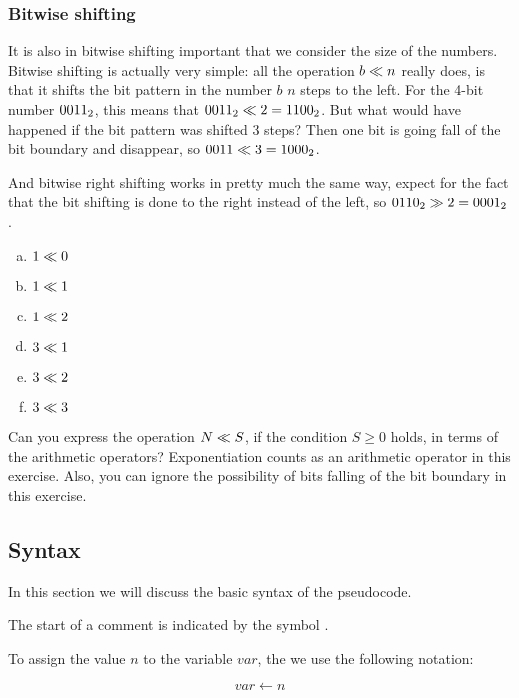 \subsubsection{Bitwise shifting}

It is also in bitwise shifting important that we consider the size of
the numbers. Bitwise shifting is actually very simple: all the
operation $b \ll n$ really does, is that it shifts the bit
pattern in the number $b$ $n$ steps to the left. For the 4-bit number
$\mbox{\ensuremath{0011_2}}$, this means that $\mbox{\ensuremath{0011_2}} \ll 2 = \mbox{\ensuremath{1100_2}}$. But what would
have happened if the bit pattern was shifted 3 steps? Then one bit is
going fall of the bit boundary and disappear, so ${0011} \ll 3 =
\mbox{\ensuremath{1000_2}}$.

And bitwise right shifting works in pretty much the same way, expect
for the fact that the bit shifting is done to the right instead of the
left, so $\mbox{\ensuremath{0110_2}} \gg 2 = \mbox{\ensuremath{0001_2}}$.

\begin{Exercise}[label={bit-equiv}]

  \begin{enumerate}[(a)]
  \item $1 \ll 0$
  \item $1 \ll 1$
  \item $1 \ll 2$
  \item $3 \ll 1$
  \item $3 \ll 2$
  \item $3 \ll 3$
  \end{enumerate}

  Can you express the operation $N \ll S$, if the condition $S
  \geq 0$ holds, in terms of the arithmetic operators? Exponentiation
  counts as an arithmetic operator in this exercise. Also, you can
  ignore the possibility of bits falling of the bit boundary in this
  exercise.

\end{Exercise}


\subsection{Syntax}

In this section we will discuss the basic syntax of the pseudocode.

The start of a comment is indicated by the symbol \commentsymbol.


\begin{samepagew}
  To assign the value $n$ to the variable $var$, the we use the
  following notation:

\begin{equation*}
  var \gets n
\end{equation*}
\end{samepagew}


